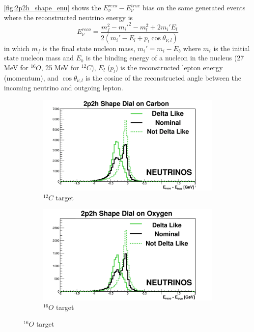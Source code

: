 \autoref{fig:2p2h_shape_enu} shows the $E_\nu^{reco}-E_\nu^{true}$ bias on the same generated events where the reconstructed neutrino energy is
\begin{equation}
	E_\nu^{reco} = \frac{m^2_f-m_i'^2-m^2_l+2m_i'E_l}{2(m_i'-E_l+p_l\cos\theta_{\nu,l})}
\end{equation}
in which $m_f$ is the final state nucleon mass, $m_i' = m_i-E_b$ where $m_i$ is the initial state nucleon mass and $E_b$ is the binding energy of a nucleon in the nucleus (27 MeV for $^{16}O$, 25 MeV for $^{12}C$), $E_l$ ($p_l$) is the reconstructed lepton energy (momentum), and $\cos\theta_{\nu,l}$ is the cosine of the reconstructed angle between the incoming neutrino and outgoing lepton.
\begin{figure}[h]
	\centering
	\begin{subfigure}[t]{0.42\textwidth}
		\includegraphics[width=\textwidth, trim={30mm 0mm 38mm 26mm}, clip,page=1]{figures/niwg/ediff_neutrino_mec_pdd_c}
		\caption{$^{12}C$ target}
	\end{subfigure}
	\begin{subfigure}[t]{0.42\textwidth}
		\includegraphics[width=\textwidth, trim={30mm 0mm 38mm 27mm}, clip,page=1]{figures/niwg/ediff_neutrino_mec_pdd_o}
		\caption{$^{16}O$ target}
	\end{subfigure}


\end{figure}
